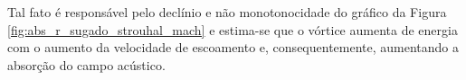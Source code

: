  Tal fato é responsável pelo declínio e não monotonocidade do gráfico da Figura \ref{fig:abs_r_sugado_strouhal_mach} e estima-se que o vórtice aumenta de energia com o aumento da velocidade de escoamento e, consequentemente, aumentando a absorção do campo acústico.   


